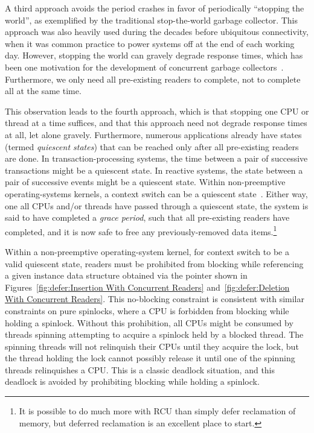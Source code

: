 A third approach avoids the period crashes in favor of periodically
``stopping the world'', as exemplified by the traditional stop-the-world
garbage collector.
This approach was also heavily used during the decades before
ubiquitous connectivity, when it was common practice to power systems
off at the end of each working day.
However, stopping the world can gravely degrade response times, which
has been one motivation for the development of concurrent garbage
collectors~\cite{DavidFBacon2003RTGC}.
Furthermore, we only need all pre-existing readers to complete, not to
complete all at the same time.

This observation leads to the fourth approach, which is that stopping
one CPU or thread at a time suffices, and that this approach need not
degrade response times at all, let alone gravely.
Furthermore, numerous applications already have states (termed
\emph{quiescent states}) that can be
reached only after all pre-existing readers are done.
In transaction-processing systems, the time between a pair of
successive transactions might be a quiescent state.
In reactive systems, the state between a pair of successive events
might be a quiescent state.
Within non-preemptive operating-systems kernels, a context switch can be
a quiescent state~\cite{McKenney98}.
Either way, one all CPUs and/or threads have passed through a quiescent
state, the system is said to have completed a \emph{grace period},
such that all pre-existing readers have completed, and it is now
safe to free any previously-removed data items.\footnote{
	It is possible to do much more with RCU than simply defer
	reclamation of memory, but deferred reclamation is an
	excellent place to start.}

Within a non-preemptive operating-system kernel, for context switch to be
a valid quiescent state, readers must be prohibited from blocking while
referencing a given instance data structure obtained via the 
pointer shown in
Figures~\ref{fig:defer:Insertion With Concurrent Readers}
and~\ref{fig:defer:Deletion With Concurrent Readers}.
This no-blocking constraint is consistent with similar constraints
on pure spinlocks, where a CPU is forbidden from blocking while
holding a spinlock.
Without this prohibition, all CPUs might be consumed by threads
spinning attempting to acquire a spinlock held by a blocked thread.
The spinning threads will not relinquish their CPUs until they acquire
the lock, but the thread holding the lock cannot possibly release it
until one of the spinning threads relinquishes a CPU.
This is a classic deadlock situation, and this deadlock is avoided
by prohibiting blocking while holding a spinlock.

